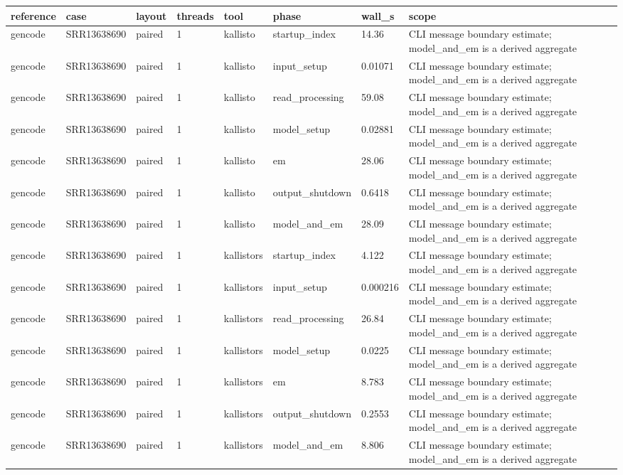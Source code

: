 \begin{tabular}{llllllll}
\toprule
reference & case & layout & threads & tool & phase & wall\_s & scope \\
\midrule
gencode & SRR13638690 & paired & 1 & kallisto & startup\_index & 14.36 & CLI message boundary estimate; model\_and\_em is a derived aggregate \\
gencode & SRR13638690 & paired & 1 & kallisto & input\_setup & 0.01071 & CLI message boundary estimate; model\_and\_em is a derived aggregate \\
gencode & SRR13638690 & paired & 1 & kallisto & read\_processing & 59.08 & CLI message boundary estimate; model\_and\_em is a derived aggregate \\
gencode & SRR13638690 & paired & 1 & kallisto & model\_setup & 0.02881 & CLI message boundary estimate; model\_and\_em is a derived aggregate \\
gencode & SRR13638690 & paired & 1 & kallisto & em & 28.06 & CLI message boundary estimate; model\_and\_em is a derived aggregate \\
gencode & SRR13638690 & paired & 1 & kallisto & output\_shutdown & 0.6418 & CLI message boundary estimate; model\_and\_em is a derived aggregate \\
gencode & SRR13638690 & paired & 1 & kallisto & model\_and\_em & 28.09 & CLI message boundary estimate; model\_and\_em is a derived aggregate \\
gencode & SRR13638690 & paired & 1 & kallistors & startup\_index & 4.122 & CLI message boundary estimate; model\_and\_em is a derived aggregate \\
gencode & SRR13638690 & paired & 1 & kallistors & input\_setup & 0.000216 & CLI message boundary estimate; model\_and\_em is a derived aggregate \\
gencode & SRR13638690 & paired & 1 & kallistors & read\_processing & 26.84 & CLI message boundary estimate; model\_and\_em is a derived aggregate \\
gencode & SRR13638690 & paired & 1 & kallistors & model\_setup & 0.0225 & CLI message boundary estimate; model\_and\_em is a derived aggregate \\
gencode & SRR13638690 & paired & 1 & kallistors & em & 8.783 & CLI message boundary estimate; model\_and\_em is a derived aggregate \\
gencode & SRR13638690 & paired & 1 & kallistors & output\_shutdown & 0.2553 & CLI message boundary estimate; model\_and\_em is a derived aggregate \\
gencode & SRR13638690 & paired & 1 & kallistors & model\_and\_em & 8.806 & CLI message boundary estimate; model\_and\_em is a derived aggregate \\

\end{tabular}

